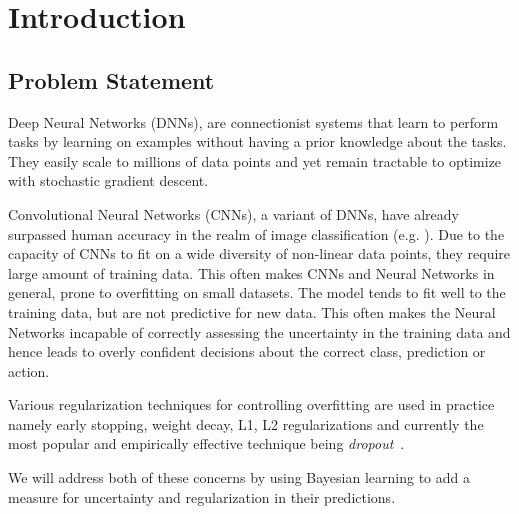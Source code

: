 
\chapter{Introduction}  %

\ifpdf
    \graphicspath{{Chapter1/Figs/Raster/}{Chapter1/Figs/PDF/}{Chapter1/Figs/}}
\else
    \graphicspath{{Chapter1/Figs/Vector/}{Chapter1/Figs/}}
\fi




\section{Problem Statement}

Deep Neural Networks (DNNs), are connectionist systems that learn to perform tasks by learning on examples without having a prior knowledge about the tasks. 
They easily scale to millions of data points and yet remain tractable to optimize with stochastic gradient descent.

Convolutional Neural Networks (CNNs), a variant of DNNs, have already surpassed human accuracy in the realm of image classification (e.g. \cite{he2016deep,simonyan2014very,krizhevsky2012imagenet}). Due to the capacity of CNNs to fit on a wide diversity of non-linear data points, they require large amount of training data. This often makes CNNs and Neural Networks in general, prone to overfitting on small datasets. The model tends to fit well to the training data, but are not predictive for new data. This often makes the Neural Networks incapable of correctly assessing the uncertainty in the training data and hence leads to overly confident decisions about the correct class, prediction or action.

Various regularization techniques for controlling overfitting are used in practice namely  early stopping, weight decay, L1, L2 regularizations and currently the most popular and empirically effective technique being \emph{dropout}~\cite{hinton2012improving}. 

We will address both of these concerns by using Bayesian learning to add a measure for uncertainty and regularization in their predictions. 

